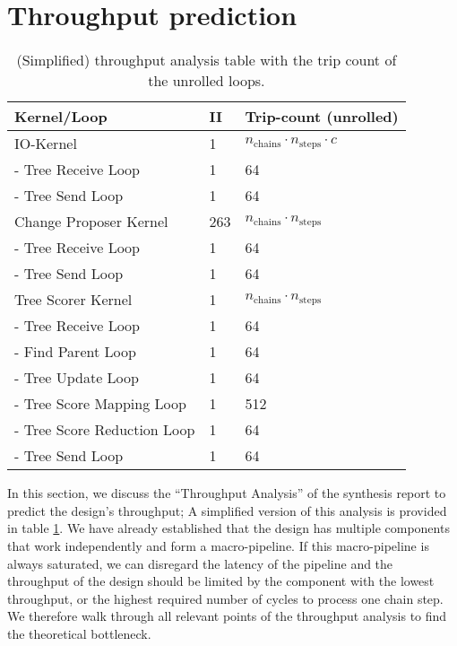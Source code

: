 \section{Throughput prediction}

\begin{table}
    \centering
    \begin{tabular}{l|l|l}
        \textbf{Kernel/Loop} & \textbf{\acs{II}} & \textbf{Trip-count (unrolled)} \\
        \hline
        IO-Kernel & 1 & $n_\mathrm{chains} \cdot n_\mathrm{steps} \cdot c$ \\
        - Tree Receive Loop & 1 & 64 \\
        - Tree Send Loop & 1 & 64 \\
        \hline
        Change Proposer Kernel & 263 & $n_\mathrm{chains} \cdot n_\mathrm{steps}$ \\
        - Tree Receive Loop & 1 & 64 \\
        - Tree Send Loop & 1 & 64 \\
        \hline
        Tree Scorer Kernel & 1 & $n_\mathrm{chains} \cdot n_\mathrm{steps}$ \\
        - Tree Receive Loop & 1 & 64 \\
        - Find Parent Loop & 1 & 64 \\
        - Tree Update Loop & 1 & 64 \\
        - Tree Score Mapping Loop & 1 & 512 \\
        - Tree Score Reduction Loop & 1 & 64 \\
        - Tree Send Loop & 1 & 64 \\
    \end{tabular}
    \caption{(Simplified) throughput analysis table with the trip count of the unrolled loops.}
    \label{tab:throughput}
\end{table}

In this section, we discuss the ``Throughput Analysis'' of the synthesis report to predict the design's throughput; A simplified version of this analysis is provided in table \ref{tab:throughput}. We have already established that the design has multiple components that work independently and form a macro-pipeline. If this macro-pipeline is always saturated, we can disregard the latency of the pipeline and the throughput of the design should be limited by the component with the lowest throughput, or the highest required number of cycles to process one chain step. We therefore walk through all relevant points of the throughput analysis to find the theoretical bottleneck.

